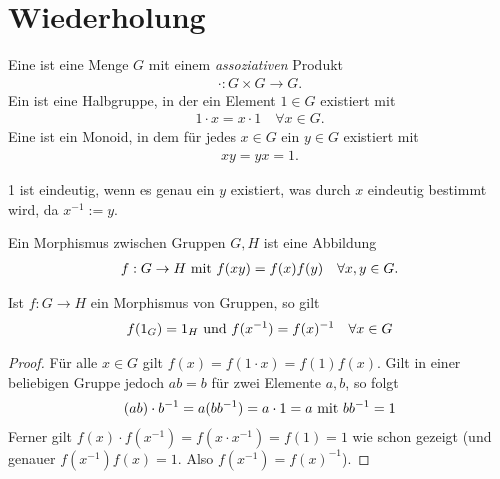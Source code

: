 \section{Wiederholung}
\begin{definition}
	Eine  ist eine Menge $G$ mit einem \emph{assoziativen} Produkt
	\begin{align*}
		\cdot\colon G \times G \to G.
	\end{align*}
	Ein  ist eine Halbgruppe, in der ein Element $1 \in G$ existiert mit 
	\begin{align*}
		1\cdot x = x\cdot 1 \quad\forall x \in G.
	\end{align*}
	Eine  ist ein Monoid, in dem für jedes $x \in G$ ein $y \in G$ existiert mit
	\begin{align*}
		xy = yx = 1.
	\end{align*}
\end{definition}
\begin{remark} %
		1 ist eindeutig, wenn es genau ein $y$ existiert, was durch $x$ eindeutig bestimmt wird, da $x^{-1} := y$.
\end{remark}
\begin{definition}[Morphismus]
	Ein Morphismus zwischen Gruppen $G,H$ ist eine Abbildung
	\begin{align*}
		f: G \to H \mit f(xy) = f(x)f(y) \quad\forall x,y \in G.
	\end{align*}
\end{definition}
\begin{proposition}
	Ist $f: G \to H$ ein Morphismus von Gruppen, so gilt
	\begin{align*}
		f(1_G) = 1_H \und f(x^{-1}) = f(x)^{-1} \quad \forall x \in G
	\end{align*}
\end{proposition}
\begin{proof}
	Für alle $x \in G$ gilt $f(x) = f(1\cdot x) = f(1)f(x)$. Gilt in einer beliebigen Gruppe jedoch $ab=b$ für zwei Elemente $a,b$, so folgt %
	\begin{align*}
		(ab)\cdot b^{-1} = a(bb^{-1}) = a\cdot 1 = a \mit bb^{-1} = 1
	\end{align*}
	Ferner gilt $f(x)\cdot f(x^{-1}) = f(x \cdot x^{-1}) = f(1) = 1$ wie schon gezeigt (und genauer $f(x^{-1})f(x) = 1$. Also $f(x^{-1}) = f(x)^{-1}$).
\end{proof}
